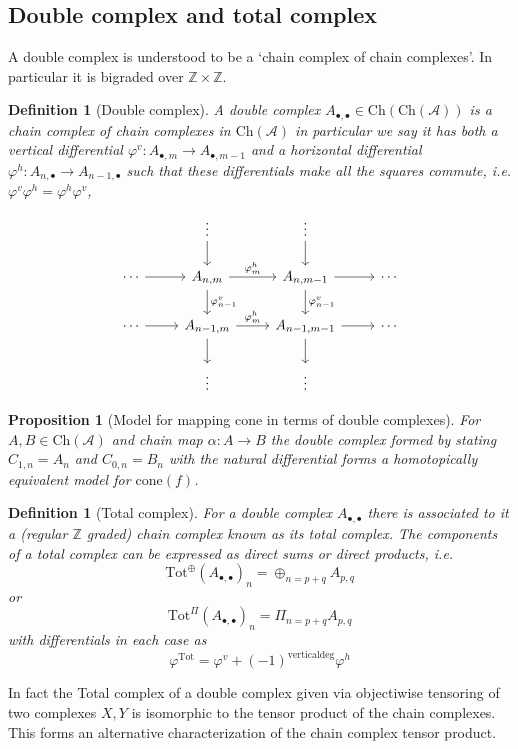\documentclass[12pt]{report}
\numberwithin{equation}{section}
\newcommand{\Z}{\mathbb{Z}}
\newtheorem{definition}[dummy]{Definition}
\newtheorem{proposition}[dummy]{Proposition}
\begin{document}
	\subsection{Double complex and total complex}
	A double complex is understood to be a `chain complex of chain complexes'. In particular it is bigraded over $\Z \times \Z$.
	\begin{definition}[Double complex]
		A double complex $A_{\bullet, \bullet}\in \mathrm{Ch}(\mathrm{Ch}(\mathcal{A}))$ is a chain complex of chain complexes in $\mathrm{Ch}(\mathcal{A})$ in particular we say it has both a vertical differential $\varphi^v: A_{\bullet, m}\to A_{\bullet, m-1} $ and a horizontal differential $\varphi^h: A_{n, \bullet} \to A_{n-1, \bullet}$  such that these differentials make all the squares commute, i.e. $\varphi^v \varphi^h=\varphi^h \varphi^v$,
		\[\begin{tikzcd}
			& \vdots & \vdots \\
			\cdots & {A_{n,m}} & {A_{n,m-1}} & \cdots \\
			\cdots & {A_{n-1,m}} & {A_{n-1,m-1}} & \cdots \\
			& \vdots & \vdots
			\arrow["{\varphi^h_{m}}", from=2-2, to=2-3]
			\arrow[from=2-3, to=2-4]
			\arrow[from=2-1, to=2-2]
			\arrow[from=1-2, to=2-2]
			\arrow[from=1-3, to=2-3]
			\arrow["{\varphi^v_{n-1}}", from=2-2, to=3-2]
			\arrow["{\varphi^v_{n-1}}", from=2-3, to=3-3]
			\arrow[from=3-2, to=4-2]
			\arrow[from=3-3, to=4-3]
			\arrow[from=3-1, to=3-2]
			\arrow["{\varphi^h_{m}}", from=3-2, to=3-3]
			\arrow[from=3-3, to=3-4]
		\end{tikzcd}\]
	\end{definition}
	\begin{proposition}[Model for mapping cone in terms of double complexes]
		For $A,B \in \mathrm{Ch}(\mathcal{A})$ and chain map $\alpha: A \to B$ the double complex formed by stating $C_{1,n}=A_n$ and $C_{0,n}=B_n$ with the natural differential forms a homotopically equivalent model for $\mathrm{cone}(f)$.
	\end{proposition}
	\begin{definition}[Total complex]
		For a double complex $A_{\bullet,\bullet}$ there is associated to it a (regular $\Z$ graded) chain complex known as its total complex. The components of a total complex can be expressed as direct sums or direct products, i.e.
		\[ \mathrm{Tot}^\oplus (A_{\bullet, \bullet})_n=\oplus_{n=p+q} A_{p,q} \]
		or
		\[ \mathrm{Tot}^\Pi (A_{\bullet, \bullet})_n=\Pi_{n=p+q} A_{p,q} \]
		with differentials in each case as 
		\[ \varphi^{\mathrm{Tot}}=\varphi^v+(-1)^{\mathrm{vertical deg}}\varphi^h \]
	\end{definition}
	In fact the Total complex of a double complex given via objectiwise tensoring of two complexes $X,Y$ is isomorphic to the tensor product of the chain complexes. This forms an alternative characterization of the chain complex tensor product.
	
\end{document}
